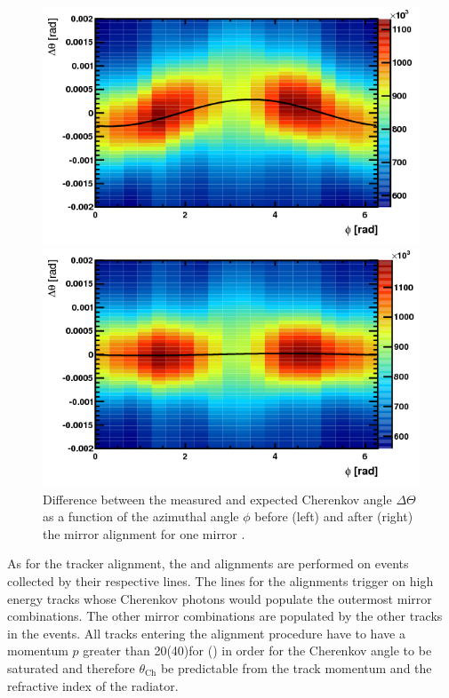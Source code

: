 \begin{figure}[h]
\begin{minipage}{0.5\columnwidth}
\includegraphics[width=\columnwidth]{../figures/RichMirror1.png}
\end{minipage}\hspace{2pc}%
\begin{minipage}{0.5\columnwidth}
\includegraphics[width=\columnwidth]{../figures/RichMirror2.png}
\end{minipage} 
\caption{\label{fig:RichMirror} Difference between the measured and
  expected Cherenkov angle $\Delta\Theta$ as a function of the azimuthal angle $\phi$ before
  (left) and after (right) the mirror alignment for one mirror \cite{LHCb-DP-2012-003}.}
\end{figure}
As for the tracker alignment, the \richone and \richtwo alignments are performed on events collected by their respective \hltone lines. The \hltone lines for the \rich alignments trigger on high energy tracks whose Cherenkov photons would populate the outermost mirror combinations. The other mirror combinations are populated by the other tracks in the events. All tracks entering the alignment procedure have to have a momentum $p$ greater than 20(40)\gev for \richone (\richtwo) in order for the Cherenkov angle to be saturated and therefore $\theta_{\mathrm{Ch}}$ be predictable from the track momentum and the refractive index of the radiator.\\
